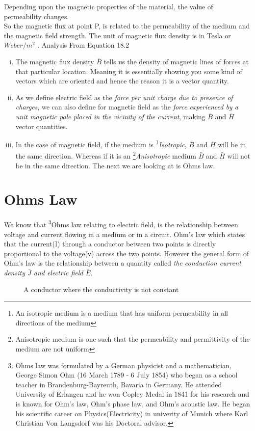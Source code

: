 Depending upon the magnetic properties of the material, the value of permeability changes. \\
So the magnetic flux at point P, is related to the permeability of the medium and the magnetic field strength. The unit of magnetic flux density is in Tesla or $Weber/m^{2}$ . Analysis From Equation 18.2
\begin{enumerate}[(i)]
\item The magnetic flux density $\bar{B}$ tells us the density of magnetic lines of forces at that particular location. Meaning it is essentially showing you some kind of vectors which are oriented and hence the reason it is a vector quantity.
\item As we define electric field as the  \emph{force per unit charge due to presence of charges}, we can also define for magnetic field as the \emph{force experienced by a unit magnetic pole placed in the vicinity of the current}, making $\bar{B}$ and $\bar{H}$ vector quantities.
\item In the case of magnetic field, if the medium is \footnote[2]{An isotropic medium is a medium that has uniform permeability in all directions of the medium }\emph{Isotropic}, $\bar{B}$ and $\bar{H}$ will be in the same direction. Whereas if it is an \footnote[3]{Anisotropic medium is one such that the permeability and permittivity of the medium are not uniform }\emph{Anisotropic} medium $\bar{B}$ and $\bar{H}$ will not be in the same direction. The next we are looking at is Ohms law.
\end{enumerate}

\section{Ohms Law} 
We know that \footnote[4]{Ohms law was formulated by a German physicist and a mathematician, George Simon Ohm (16 March 1789 - 6 July 1854) who began as a school teacher in Brandenburg-Bayreuth, Bavaria in Germany. He attended University of Erlangen and he won Copley Medal in 1841 for his research and is known for Ohm's law, Ohm's phase law, and Ohm's acoustic law. He began his scientific career on Physics(Electricity) in univerity of Munich where Karl Christian Von Langsdorf was his Doctoral advisor.}Ohms law relating to electric field, is the relationship between voltage and current flowing in a medium or in a circuit. Ohm's law which states that the current(I) through a conductor between two points is directly proportional to the voltage(v) across the two points. However the general form of Ohm's law is the relationship between a quantity called \emph{the conduction current density $ \bar{J} $ and electric field $ \bar{E} $}.
\begin{figure}
\centering
\caption{A conductor where the conductivity is not constant}
\label{}
\end{figure}

